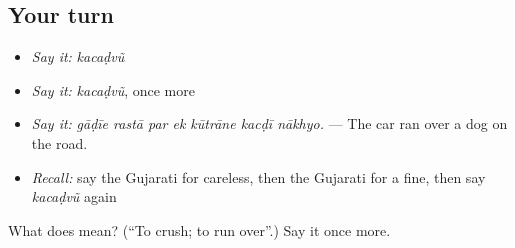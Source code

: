 \subsection*{Your turn}
\begin{itemize}
\raggedright
  \item \emph{Say it:} \emph{kacaḍvũ}
  \item \emph{Say it:} \emph{kacaḍvũ}, once more
  \item \emph{Say it:} \emph{gāḍīe rastā par ek kūtrāne kacḍī nākhyo.} — The car ran over a dog on the road.
  \item \emph{Recall:} say the Gujarati for careless, then the Gujarati for a fine, then say \emph{kacaḍvũ} again
\end{itemize}

\begin{tcolorbox}[breakable,colback=teal!4,colframe=teal!35!black,title={Before you move on}]
What does  mean? (\textquotedblleft{}To crush; to run over\textquotedblright{}.) Say it once more.
\end{tcolorbox}

